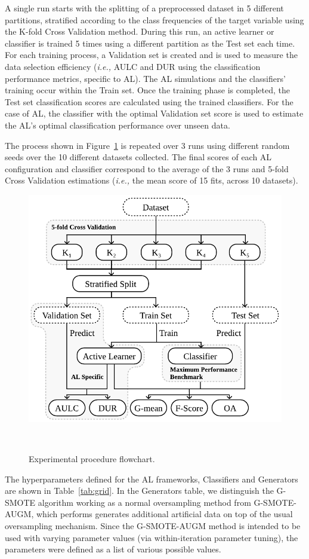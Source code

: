 \documentclass[parskip=full]{scrartcl}
\begin{document}
A single run starts with the splitting of a preprocessed dataset in 5
different partitions, stratified according to the class frequencies of the
target variable using the K-fold Cross Validation method. During this run, an
active learner or classifier is trained 5 times using a different partition as
the Test set each time. For each training process, a Validation set is created
and is used to measure the data selection efficiency (\textit{i.e.,} AULC and
DUR using the classification performance metrics, specific to AL). The AL
simulations and the classifiers' training occur within the Train set. Once the
training phase is completed, the Test set classification scores are calculated
using the trained classifiers. For the case of AL, the classifier with the
optimal Validation set score is used to estimate the AL's optimal
classification performance over unseen data.

The process shown in Figure~\ref{fig:experimental_procedure} is repeated over
3 runs using different random seeds over the 10 different datasets collected.
The final scores of each AL configuration and classifier correspond to the
average of the 3 runs and 5-fold Cross Validation estimations (\textit{i.e.,}
the mean score of 15 fits, across 10 datasets).

\begin{figure}[H]
	\centering
	\includegraphics[width=.6\linewidth]{../analysis/experimental_procedure}
    \caption{%
        Experimental procedure flowchart.
    }~\label{fig:experimental_procedure}
\end{figure}

The hyperparameters defined for the AL frameworks, Classifiers and Generators
are shown in Table~\ref{tab:grid}. In the Generators table, we distinguish the
G-SMOTE algorithm working as a normal oversampling method from G-SMOTE-AUGM,
which performs generates additional artificial data on top of the usual
oversampling mechanism. Since the G-SMOTE-AUGM method is intended to be used
with varying parameter values (via within-iteration parameter tuning), the
parameters were defined as a list of various possible values.
\end{document}
